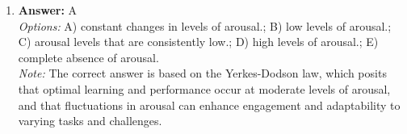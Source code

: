\documentclass[12pt]{article}
\begin{document}
\begin{enumerate}[label=\arabic*.]
\\ \textit{Note:} Harlow's monkey experiment demonstrated that infant monkeys preferred to cling to a soft, comforting surrogate mother over a wire mother that provided food, highlighting the crucial role of physical contact and emotional comfort in healthy psychological development.
\item \textbf{Answer:} A
\\ \textit{Options:} A) constant changes in levels of arousal.; B) low levels of arousal.; C) arousal levels that are consistently low.; D) high levels of arousal.; E) complete absence of arousal.
\\ \textit{Note:} The correct answer is based on the Yerkes-Dodson law, which posits that optimal learning and performance occur at moderate levels of arousal, and that fluctuations in arousal can enhance engagement and adaptability to varying tasks and challenges.
\end{enumerate}
\end{document}

